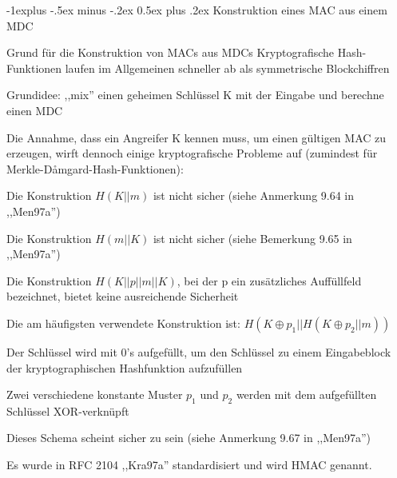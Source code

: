 \documentclass[a4paper]{article}
\makeatletter
\renewcommand{\subsection}{\@startsection{subsection}{2}{0mm}%
 {-1explus -.5ex minus -.2ex}%
 {0.5ex plus .2ex}%
 {\normalfont\normalsize\bfseries}}
\makeatother
\begin{document}
\begin{multicols}{3}
      \subsection{Konstruktion eines MAC aus einem MDC}
      \begin{itemize*}
            \item Grund für die Konstruktion von MACs aus MDCs Kryptografische Hash-Funktionen laufen im Allgemeinen schneller ab als symmetrische Blockchiffren
            \item Grundidee: ,,mix'' einen geheimen Schlüssel K mit der Eingabe und berechne einen MDC
            \item Die Annahme, dass ein Angreifer K kennen muss, um einen gültigen MAC zu erzeugen, wirft dennoch einige kryptografische Probleme auf (zumindest für Merkle-Dåmgard-Hash-Funktionen):
            \begin{itemize*}
                  \item Die Konstruktion $H(K|| m)$ ist nicht sicher (siehe Anmerkung 9.64 in ,,Men97a'')
                  \item Die Konstruktion $H(m|| K)$ ist nicht sicher (siehe Bemerkung 9.65 in ,,Men97a'')
                  \item Die Konstruktion $H(K|| p|| m|| K)$, bei der p ein zusätzliches Auffüllfeld bezeichnet, bietet keine ausreichende Sicherheit
            \end{itemize*}
            \item Die am häufigsten verwendete Konstruktion ist: $H(K\oplus p_1|| H(K\oplus p_2|| m))$
            \begin{itemize*}
                  \item Der Schlüssel wird mit 0's aufgefüllt, um den Schlüssel zu einem Eingabeblock der kryptographischen Hashfunktion aufzufüllen
                  \item Zwei verschiedene konstante Muster $p_1$ und $p_2$ werden mit dem aufgefüllten Schlüssel XOR-verknüpft
                  \item Dieses Schema scheint sicher zu sein (siehe Anmerkung 9.67 in ,,Men97a'')
                  \item Es wurde in RFC 2104 ,,Kra97a'' standardisiert und wird HMAC genannt.
            \end{itemize*}
      \end{itemize*}


\end{multicols}
\end{document}
